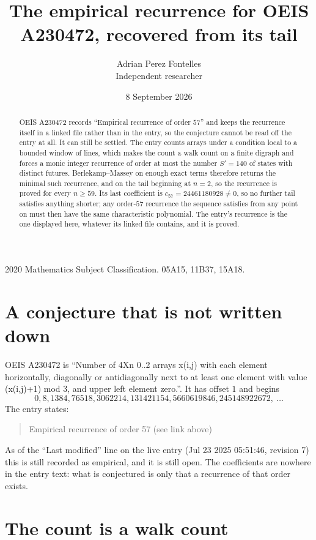 \documentclass[11pt,a4paper]{article}
\title{The empirical recurrence for OEIS A230472, recovered from its tail}
\author{Adrian Perez Fontelles\\ \small Independent researcher}
\date{8 September 2026}
\theoremstyle{plain}
\theoremstyle{definition}
\begin{document}
\maketitle

\begin{abstract}
OEIS A230472 records ``Empirical recurrence of order $57$'' and keeps the recurrence itself in
a linked file rather than in the entry, so the conjecture cannot be read off the entry at all.
It can still be settled. The entry counts arrays under a condition local to a bounded window of
lines, which makes the count a walk count on a finite digraph and forces a monic integer
recurrence of order at most the number $S'=140$ of states with distinct futures. Berlekamp--Massey on
enough exact terms therefore returns the minimal such recurrence, and on the tail beginning at $n=2$, so the recurrence is proved for every $n\ge59$.
Its last coefficient is $c_{57}=24461180928\neq0$, so no further tail satisfies anything
shorter; any order-$57$ recurrence the sequence satisfies from any point on must then have
the same characteristic polynomial. The entry's recurrence is the one displayed here, whatever
its linked file contains, and it is proved.
\end{abstract}

\noindent\small 2020 Mathematics Subject Classification. 05A15, 11B37, 15A18.\normalsize

\section{A conjecture that is not written down}

OEIS A230472 is ``Number of 4Xn 0..2 arrays x(i,j) with each element horizontally, diagonally or antidiagonally next to at least one element with value (x(i,j)+1) mod 3, and upper left element zero.''. It has offset $1$ and begins
\[
0, 8, 1384, 76518, 3062214, 131421154, 5660619846, 245148922672,\ \dots
\]
The entry states:
\begin{quote}
Empirical recurrence of order 57 (see link above)
\end{quote}
As of the ``Last modified'' line on the live entry (Jul 23 2025 05:51:46, revision 7)
this is still recorded as empirical, and it is still open. The coefficients are nowhere in the
entry text: what is conjectured is only that a recurrence of that order exists.

\section{The count is a walk count}
\end{document}
